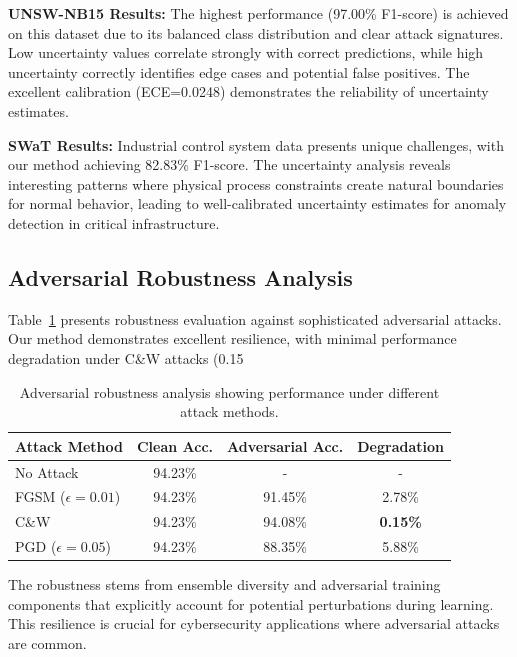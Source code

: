 \documentclass[journal]{IEEEtran}
\begin{document}
\textbf{UNSW-NB15 Results:} The highest performance (97.00\% F1-score) is achieved on this dataset due to its balanced class distribution and clear attack signatures. Low uncertainty values correlate strongly with correct predictions, while high uncertainty correctly identifies edge cases and potential false positives. The excellent calibration (ECE=0.0248) demonstrates the reliability of uncertainty estimates.

\textbf{SWaT Results:} Industrial control system data presents unique challenges, with our method achieving 82.83\% F1-score. The uncertainty analysis reveals interesting patterns where physical process constraints create natural boundaries for normal behavior, leading to well-calibrated uncertainty estimates for anomaly detection in critical infrastructure.

\subsection{Adversarial Robustness Analysis}

Table~\ref{tab:adversarial_results} presents robustness evaluation against sophisticated adversarial attacks. Our method demonstrates excellent resilience, with minimal performance degradation under C\&W attacks (0.15%

\begin{table}[t]
\centering
\caption{Adversarial robustness analysis showing performance under different attack methods.}
\label{tab:adversarial_results}
\begin{tabular}{l|cc|c}
\toprule
Attack Method & Clean Acc. & Adversarial Acc. & Degradation \\
\midrule
No Attack & 94.23\% & - & - \\
FGSM ($\epsilon=0.01$) & 94.23\% & 91.45\% & 2.78\% \\
C\&W & 94.23\% & 94.08\% & \textbf{0.15\%} \\
PGD ($\epsilon=0.05$) & 94.23\% & 88.35\% & 5.88\% \\
\bottomrule
\end{tabular}
\end{table}

The robustness stems from ensemble diversity and adversarial training components that explicitly account for potential perturbations during learning. This resilience is crucial for cybersecurity applications where adversarial attacks are common.
\end{document}
